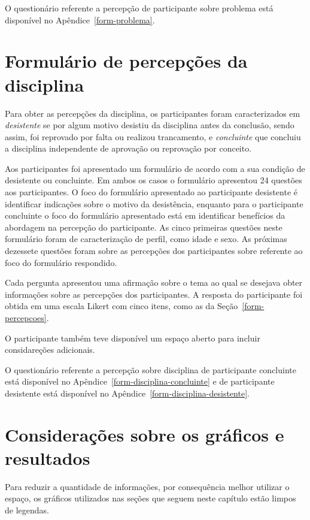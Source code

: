 O questionário referente a percepção de participante sobre problema está disponível no
Apêndice~\ref{form-problema}.

\section{Formulário de percepções da disciplina}
\label{form-disciplinas}
Para obter as percepções da disciplina, os participantes foram caracterizados em \textit{desistente}
se por algum motivo desistiu da disciplina antes da conclusão, sendo assim, foi reprovado por
falta ou realizou trancamento, e \textit{concluinte} que concluiu a disciplina independente
de aprovação ou reprovação por conceito.

Aos participantes foi apresentado um formulário de acordo com a sua condição de desistente
ou concluinte.
Em ambos os casos o formulário apresentou 24 questões aos participantes.
O foco do formulário apresentado ao participante desistente é identificar indicações
sobre o motivo da desistência, enquanto para o participante concluinte o foco do
formulário apresentado está em identificar benefícios da abordagem na percepção
do participante.
As cinco primeiras questões neste formulário foram de caracterização de perfil, como
idade e sexo.
As próximas dezessete questões foram sobre as percepções dos participantes sobre referente
ao foco do formulário respondido.

Cada pergunta apresentou uma afirmação sobre o tema ao qual se desejava obter informações sobre as
percepções dos participantes.
A resposta do participante foi obtida em uma escala Likert com cinco itens, como as da Seção~\ref{form-percepcoes}.

O participante também teve disponível um espaço aberto para incluir considareções adicionais.

O questionário referente a percepção sobre disciplina de participante
concluinte está disponível no Apêndice~\ref{form-disciplina-concluinte}
e de participante desistente está disponível no
Apêndice~\ref{form-disciplina-desistente}.

\section{Considerações sobre os gráficos e resultados}
\label{sec-ref-graficos}
Para reduzir a quantidade de informações, por consequência melhor utilizar o
espaço, os gráficos utilizados nas seções que seguem neste capítulo
estão limpos de legendas.

